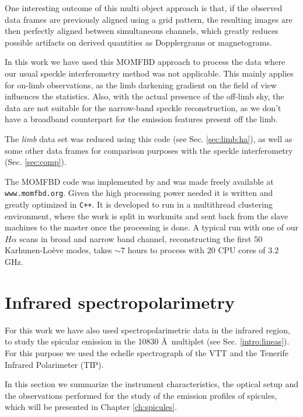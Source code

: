 One interesting outcome of this multi object approach is that, if the observed data frames are previously aligned using a grid pattern, the resulting images are then perfectly aligned between simultaneous channels, which greatly reduces possible artifacts on derived quantities as Dopplergrams or magnetograms.

In this work we have used this MOMFBD approach to process the data where our usual speckle interferometry method was not applicable. This mainly applies for on-limb observations, as the limb darkening gradient on the field of view influences the statistics. Also, with the actual presence of the off-limb sky, the data are not suitable for the narrow-band speckle reconstruction, as we don't have a broadband counterpart for the emission features present off the limb.

The \emph{limb} data set was reduced using this code (see Sec. \ref{sec:limb:ha}), as well as some other data frames for comparison purposes with the speckle interferometry  (Sec. \ref{sec:comp}).

The MOMFBD code was implemented by \cite{2005SoPh..228..191V} and was made freely available at \verb"www.momfbd.org". Given the high processing power needed it is written and greatly optimized in \verb"C++". It is developed to run in a multithread clustering environment, where the work is split in workunits and sent back from the slave machines to the master once the processing is done. A typical run with one of our $H\alpha$ scans in broad and narrow band channel, reconstructing the first 50 Karhunen-Lo\`eve modes, takes $\sim7$ hours to process with 20 CPU cores of $3.2$ GHz.



\section{Infrared spectropolarimetry}

For this work we have also used spectropolarimetric data in the infrared region, to study the spicular emission in the  10830 \AA\, multiplet (see Sec. \ref{intro:lineas}). 
For this purpose we used the echelle spectrograph of the VTT and the Tenerife Infrared Polarimeter (TIP).

In this section we summarize the instrument characteristics, the optical setup
 and the observations performed for the study of the emission profiles of spicules, which will be presented in Chapter \ref{ch:spicules}.


